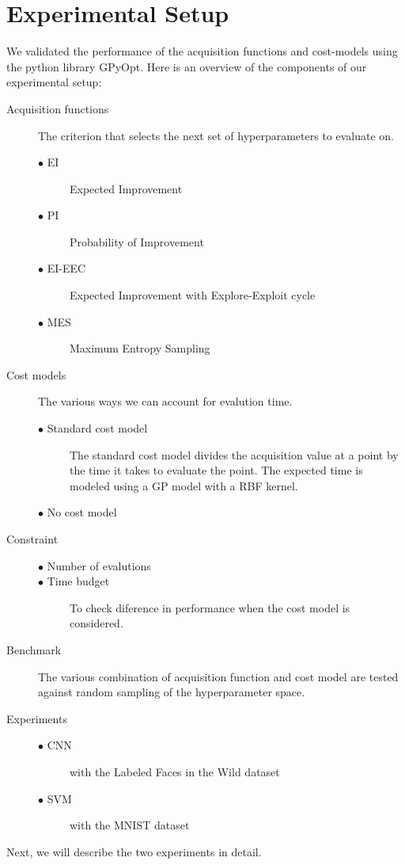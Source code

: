 \documentclass[letterpaper]{article}
\begin{document}
\section{Experimental Setup}
We validated the performance of the acquisition functions and cost-models using the python library GPyOpt.
Here is an overview of the components of our experimental setup:

\begin{description}
\item[Acquisition functions] The criterion that selects the next set of hyperparameters to evaluate on.
	\begin{description}
	\item [$\bullet$ EI] Expected Improvement
	\item [$\bullet$ PI] Probability of Improvement
	\item [$\bullet$ EI-EEC] Expected Improvement with Explore-Exploit cycle
	\item [$\bullet$ MES] Maximum Entropy Sampling
	\end{description}
\item[Cost models] The various ways we can account for evalution time.
	\begin{description}
	\item [$\bullet$ Standard cost model] The standard cost model divides the acquisition value at a point by the time it takes to evaluate the point.
						       The expected time is modeled using a GP model with a RBF kernel.
	\item [$\bullet$ No cost model]
	\end{description}
\item[Constraint] \leavevmode
	\begin{description}
	\item [$\bullet$ Number of evalutions] \leavevmode
	\item [$\bullet$ Time budget] To check diference in performance when the cost model is considered.
	\end{description}
\item[Benchmark] The various combination of acquisition function and cost model are tested against random sampling of the hyperparameter space.
\item[Experiments] \leavevmode
	\begin{description}
	\item [$\bullet$ CNN] with the Labeled Faces in the Wild dataset
	\item [$\bullet$ SVM] with the MNIST dataset
	\end{description}
\end{description}
Next, we will describe the two experiments in detail.
\end{document}
